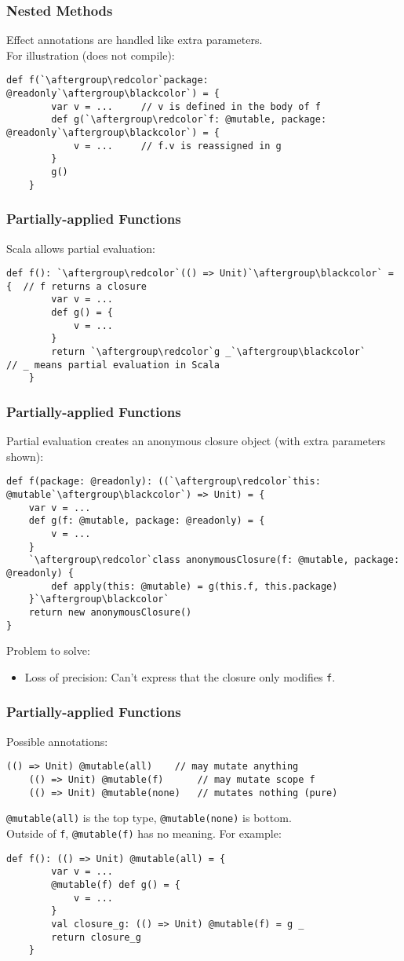 \documentclass{beamer}
\newcommand{\code}[1]{\lstinline$#1$}
\begin{document}
\begin{frame}[containsverbatim]
\frametitle{Nested Methods}
Effect annotations are handled like extra parameters.\\
For illustration (does not compile):
\begin{lstlisting}[escapechar=`]
	def f(`\aftergroup\redcolor`package: @readonly`\aftergroup\blackcolor`) = {
		var v = ...     // v is defined in the body of f
		def g(`\aftergroup\redcolor`f: @mutable, package: @readonly`\aftergroup\blackcolor`) = {
			v = ...     // f.v is reassigned in g
		}
		g()
	}
\end{lstlisting}
\end{frame}

\begin{frame}[containsverbatim]
\frametitle{Partially-applied Functions}
Scala allows partial evaluation:
\begin{lstlisting}[escapechar=`]
	def f(): `\aftergroup\redcolor`(() => Unit)`\aftergroup\blackcolor` = {  // f returns a closure
		var v = ...
		def g() = {
			v = ...
		}
		return `\aftergroup\redcolor`g _`\aftergroup\blackcolor`      // _ means partial evaluation in Scala
	}
\end{lstlisting}
\end{frame}

\begin{frame}[containsverbatim]
\frametitle{Partially-applied Functions}
Partial evaluation creates an anonymous closure object
(with extra parameters shown):
\begin{lstlisting}[escapechar=`]
def f(package: @readonly): ((`\aftergroup\redcolor`this: @mutable`\aftergroup\blackcolor`) => Unit) = {
	var v = ...
	def g(f: @mutable, package: @readonly) = {
		v = ...
	}
	`\aftergroup\redcolor`class anonymousClosure(f: @mutable, package: @readonly) {
		def apply(this: @mutable) = g(this.f, this.package)
	}`\aftergroup\blackcolor`
	return new anonymousClosure()
}
\end{lstlisting}
Problem to solve:
\begin{itemize}
\item Loss of precision: Can't express that the closure only modifies \code{f}.
\end{itemize}
\end{frame}

\begin{frame}[containsverbatim]
\frametitle{Partially-applied Functions}
Possible annotations:
\begin{lstlisting}[escapechar=`]
	(() => Unit) @mutable(all)    // may mutate anything
	(() => Unit) @mutable(f)      // may mutate scope f
	(() => Unit) @mutable(none)   // mutates nothing (pure)
\end{lstlisting}
\code{@mutable(all)} is the top type, \code{@mutable(none)} is bottom.\\
Outside of \code{f}, \code{@mutable(f)} has no meaning. For example:
\begin{lstlisting}[escapechar=`]
	def f(): (() => Unit) @mutable(all) = {
		var v = ...
		@mutable(f) def g() = {
			v = ...
		}
		val closure_g: (() => Unit) @mutable(f) = g _
		return closure_g
	}
\end{lstlisting}
\end{frame}
\end{document}
